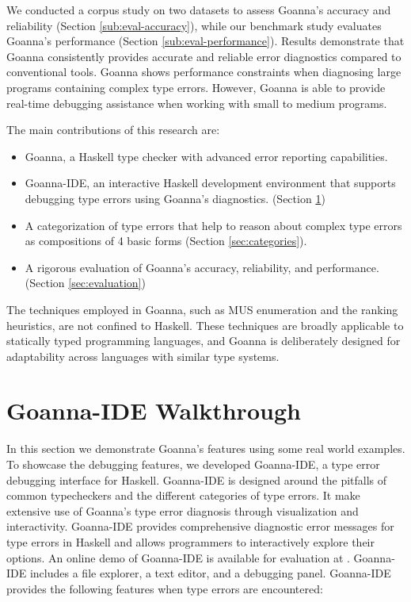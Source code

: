 \documentclass[pdflatex,lineno,sn-nature,Numbered]{sn-jnl}%
\begin{document}
We conducted a corpus study on two datasets to assess Goanna's accuracy and reliability (Section \ref{sub:eval-accuracy}), while our benchmark study evaluates Goanna's performance (Section \ref{sub:eval-performance}). Results demonstrate that Goanna consistently provides accurate and reliable error diagnostics compared to conventional tools. Goanna shows performance constraints when diagnosing large programs containing complex type errors. However, Goanna is able to provide real-time debugging assistance when working with small to medium programs.

The main contributions of this research are:
\begin{itemize}
    \item Goanna, a Haskell type checker with advanced error reporting capabilities.
    \item Goanna-IDE, an interactive Haskell development environment that supports debugging type errors using Goanna's diagnostics. (Section \ref{sec:walkthrough})
    \item A categorization of type errors that help to reason about complex type errors as compositions of 4 basic forms (Section \ref{sec:categories}).
    \item A rigorous evaluation of Goanna's accuracy, reliability, and performance. (Section \ref{sec:evaluation})
\end{itemize}

The techniques employed in Goanna, such as MUS enumeration and the ranking heuristics, are not confined to Haskell. These techniques are broadly applicable to statically typed programming languages, and Goanna is deliberately designed for adaptability across languages with similar type systems.

\section{Goanna-IDE Walkthrough} \label{sec:walkthrough}
In this section we  demonstrate Goanna's features using some real world examples. To showcase the debugging features,  we developed Goanna-IDE, a type error debugging interface for Haskell. Goanna-IDE is designed around the pitfalls of common typecheckers and the different categories of type errors. It make extensive use of Goanna's type error diagnosis through visualization and interactivity. Goanna-IDE provides comprehensive diagnostic error messages for type errors in Haskell and allows programmers to interactively explore their options. An online demo of Goanna-IDE is available for evaluation at \cite{Fu2023-bo}. Goanna-IDE includes a file explorer, a text editor, and a debugging panel. Goanna-IDE provides the following features when type errors are encountered:
\end{document}
